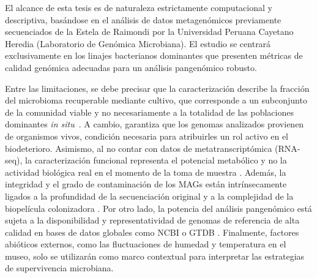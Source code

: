 
El alcance de esta tesis es de naturaleza estrictamente computacional y descriptiva, basándose en el análisis de datos metagenómicos previamente secuenciados de la Estela de Raimondi por la Universidad Peruana Cayetano Heredia (Laboratorio de Genómica Microbiana). El estudio se centrará exclusivamente en los linajes bacterianos dominantes que presenten métricas de calidad genómica adecuadas para un análisis pangenómico robusto.

Entre las limitaciones, se debe precisar que la caracterización
describe la fracción del microbioma recuperable mediante cultivo, que corresponde a un
subconjunto de la comunidad viable y no necesariamente a la totalidad de las
poblaciones dominantes \textit{in situ}~\cite{sterflinger2013,branysova2022}. A cambio,
garantiza que los genomas analizados provienen de organismos vivos, condición necesaria
para atribuirles un rol activo en el biodeterioro. Asimismo, al no contar con datos de metatranscriptómica (RNA-seq), la caracterización funcional representa el potencial metabólico y no la actividad biológica real en el momento de la toma de muestra \cite{cappitelli2020}. Además, la integridad y el grado de contaminación de los MAGs están intrínsecamente ligados a la profundidad de la secuenciación original y a la complejidad de la biopelícula colonizadora \cite{villa2016,checkm2}. Por otro lado, la potencia del análisis pangenómico está sujeta a la disponibilidad y representatividad de genomas de referencia de alta calidad en bases de datos globales como NCBI o GTDB \cite{gtdbtk2019}. Finalmente, factores abióticos externos, como las fluctuaciones de humedad y temperatura en el museo, solo se utilizarán como marco contextual para interpretar las estrategias de supervivencia microbiana.